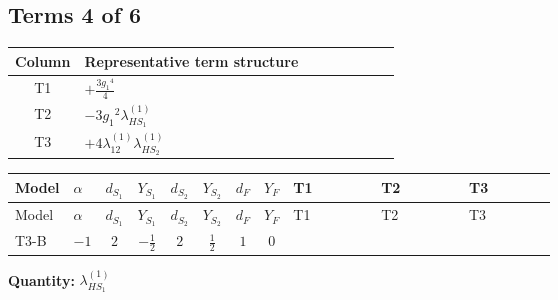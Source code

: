 \documentclass[8pt]{article}
\begin{document}
\begin{landscape}
\subsection*{Terms 4 of 6}
\begin{center}
\begin{tabular}{@{}c >{\raggedright\arraybackslash}p{0.82\linewidth}@{}}
\toprule
Column & Representative term structure \\
\midrule
T1 & \(\displaystyle +\frac{3 {g_1}^4}{4}\) \\
\midrule
T2 & \(\displaystyle -3 {g_1}^2 {\lambda_{HS_1}^{(1)}}\) \\
\midrule
T3 & \(\displaystyle +4 {\lambda_{12}^{(1)}} {\lambda_{HS_2}^{(1)}}\) \\
\midrule
\bottomrule
\end{tabular}
\end{center}
\smallskip
\tiny
\begin{longtable}{@{}llcccccc >{\raggedright\arraybackslash}p{0.21\linewidth} >{\raggedright\arraybackslash}p{0.21\linewidth} >{\raggedright\arraybackslash}p{0.21\linewidth}@{}}
\toprule
Model & $\alpha$ & $d_{S_1}$ & $Y_{S_1}$ & $d_{S_2}$ & $Y_{S_2}$ & $d_F$ & $Y_F$ & T1 & T2 & T3 \\
\midrule
\endfirsthead
\toprule
Model & $\alpha$ & $d_{S_1}$ & $Y_{S_1}$ & $d_{S_2}$ & $Y_{S_2}$ & $d_F$ & $Y_F$ & T1 & T2 & T3 \\
\midrule
\endhead
T3-B & $-1$ & $2$ & $-\frac{1}{2}$ & $2$ & $\frac{1}{2}$ & $1$ & $0$ & \scriptsize\adjustbox{max width=\linewidth}{$\begin{gathered} +\frac{3 {g_1}^4}{4}\end{gathered}$} & \scriptsize\adjustbox{max width=\linewidth}{$\begin{gathered} -3 {g_1}^2 {\lambda_{HS_1}^{(1)}}\end{gathered}$} & \scriptsize\adjustbox{max width=\linewidth}{$\begin{gathered} +4 {\lambda_{12}^{(1)}} {\lambda_{HS_2}^{(1)}}\end{gathered}$} \\
\midrule
\bottomrule
\end{longtable}
\clearpage
\noindent\textbf{Quantity: }$\lambda_{HS_1}^{(1)}$\par\smallskip

\end{landscape}
\end{document}

